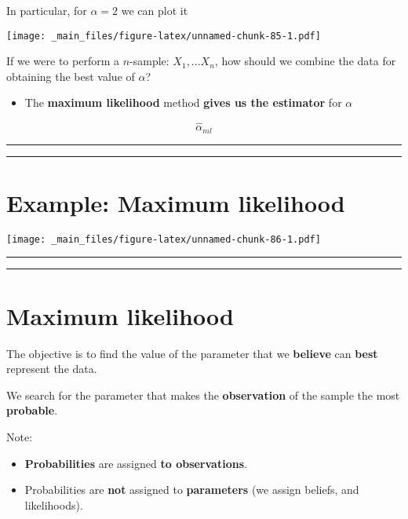\documentclass[
]{book}
\providecommand{\tightlist}{%
  \setlength{\itemsep}{0pt}\setlength{\parskip}{0pt}}
\begin{document}
In particular, for \(\alpha=2\) we can plot it

\texttt{[image: \_main\_files/figure-latex/unnamed-chunk-85-1.pdf]}

If we were to perform a \(n\)-sample: \(X_1,...X_n\), how should we combine the data for obtaining the best value of \(\alpha\)?

\begin{itemize}
\tightlist
\item
  The \textbf{maximum likelihood} method \textbf{gives us the estimator} for \(\alpha\)
\end{itemize}

\[\hat{\alpha}_{ml}\]

\begin{center}\rule{0.5\linewidth}{0.5pt}\end{center}

\begin{center}\rule{0.5\linewidth}{0.5pt}\end{center}

\hypertarget{example-maximum-likelihood}{%
\section{Example: Maximum likelihood}\label{example-maximum-likelihood}}

\texttt{[image: \_main\_files/figure-latex/unnamed-chunk-86-1.pdf]}

\begin{center}\rule{0.5\linewidth}{0.5pt}\end{center}

\begin{center}\rule{0.5\linewidth}{0.5pt}\end{center}

\hypertarget{maximum-likelihood-2}{%
\section{Maximum likelihood}\label{maximum-likelihood-2}}

The objective is to find the value of the parameter that we \textbf{believe} can \textbf{best} represent the data.

We search for the parameter that makes the \textbf{observation} of the sample the most \textbf{probable}.

Note:

\begin{itemize}
\tightlist
\item
  \textbf{Probabilities} are assigned \textbf{to observations}.
\item
  Probabilities are \textbf{not} assigned to \textbf{parameters} (we assign beliefs, and likelihoods).
\end{itemize}
\end{document}
